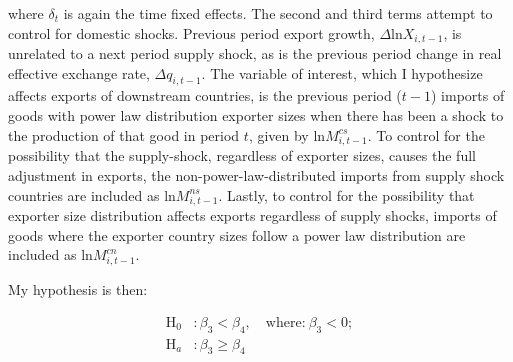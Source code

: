 \documentclass[10pt,letterpaper]{article}
\begin{document}
where $\delta_t$ is again the time fixed effects. The second and third terms attempt to control for domestic shocks. Previous period export growth, $\Delta \text{ln} X_{i,t-1}$,  is unrelated to a next period supply shock, as is the previous period change in real effective exchange rate, $\Delta q_{i,t-1}$. The variable of interest, which I hypothesize affects exports of downstream countries, is the previous period ($t-1$) imports of goods with power law distribution exporter sizes when there has been a shock to the production of that good in period $t$, given by $\text{ln} M^{cs}_{i,t-1}$. To control for the possibility that the supply-shock, regardless of exporter sizes, causes the full adjustment in exports, the non-power-law-distributed imports from supply shock countries are included as $\text{ln} M^{ns}_{i,t-1}$. Lastly, to control for the possibility that exporter size distribution affects exports regardless of supply shocks, imports of goods where the exporter country sizes follow a power law distribution are included as $\text{ln} M^{cn}_{i,t-1}$.

My hypothesis is then:

\begin{align*}
\text{H}_0 &: \beta_3 < \beta_4, \quad \text{where:} \ \beta_3 < 0; \\
\text{H}_a &: \beta_3 \geq \beta_4 
\end{align*}
\end{document}
